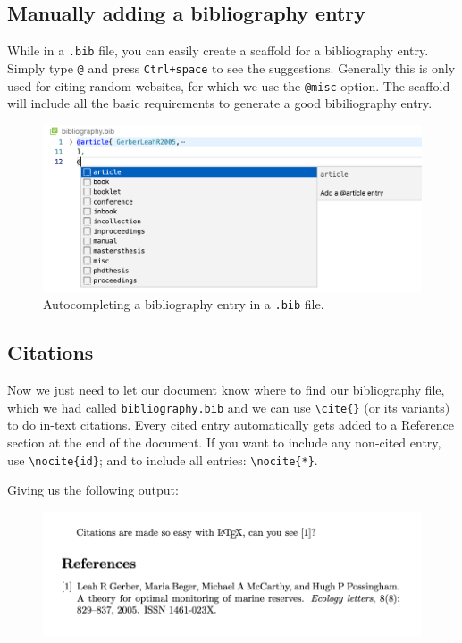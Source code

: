\subsection{Manually adding a bibliography entry}
While in a \verb|.bib| file, you can easily create a scaffold for a bibliography entry.
Simply type \verb|@| and press \verb|Ctrl+space| to see the suggestions.
Generally this is only used for citing random websites, for which we use the \verb|@misc| option.
The scaffold will include all the basic requirements to generate a good bibiliography entry.
\begin{figure}[h]
  \centering
    \includegraphics[width=\textwidth]{figures/bib-entry.png}
  \caption{Autocompleting a bibliography entry in a \texttt{.bib} file.}
  \label{fig:bib-entry}
\end{figure}

\subsection{Citations}
Now we just need to let our document know where to find our bibliography file, which we had called \verb|bibliography.bib| and we can use \verb|\cite{}| (or its variants) to do in-text citations.
Every cited entry automatically gets added to a Reference section at the end of the document.
If you want to include any non-cited entry, use \verb|\nocite{id}|; and to include all entries: \verb|\nocite{*}|.


Giving us the following output:
\begin{figure}[h]
  \centering
    \includegraphics[]{figures/references.png}
  \label{fig:references}
\end{figure}

